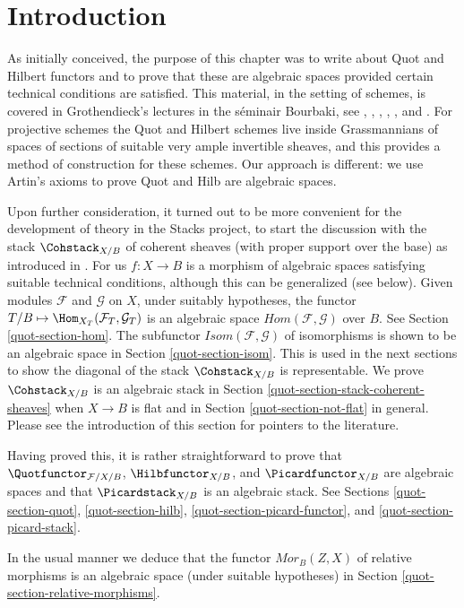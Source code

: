 \section{Introduction}
\label{quot-section-introduction}
As initially conceived, the purpose of this chapter was to write about
Quot and Hilbert functors and to prove that these are algebraic spaces
provided certain technical conditions are satisfied. This material, in
the setting of schemes, is
covered in Grothendieck's lectures in the s\'eminair Bourbaki, see
\cite{Gr-I},
\cite{Gr-II},
\cite{Gr-III},
\cite{Gr-IV},
\cite{Gr-V}, and
\cite{Gr-VI}. For projective schemes the Quot and Hilbert schemes
live inside Grassmannians of spaces of sections of suitable very
ample invertible sheaves, and this provides a method of construction
for these schemes. Our approach is different: we use Artin's axioms to
prove Quot and Hilb are algebraic spaces.

\medskip\noindent
Upon further consideration, it turned out to be more convenient for
the development of theory in the Stacks project, to start the
discussion with the stack $\Cohstack_{X/B}$
of coherent sheaves (with proper support over the base)
as introduced in \cite{lieblich_remarks}. For us $f : X \to B$
is a morphism of algebraic spaces satisfying suitable
technical conditions, although this can be generalized (see below).
Given modules $\mathcal{F}$ and $\mathcal{G}$
on $X$, under suitably hypotheses, the functor
$T/B \mapsto \Hom_{X_T}(\mathcal{F}_T, \mathcal{G}_T)$
is an algebraic space $\mathit{Hom}(\mathcal{F}, \mathcal{G})$
over $B$. See Section \ref{quot-section-hom}. The subfunctor
$\mathit{Isom}(\mathcal{F}, \mathcal{G})$ of isomorphisms is
shown to be an algebraic space in Section \ref{quot-section-isom}.
This is used in the next sections to show the diagonal of
the stack $\Cohstack_{X/B}$ is representable. We prove
$\Cohstack_{X/B}$ is an algebraic stack in
Section \ref{quot-section-stack-coherent-sheaves} when $X \to B$ is flat
and in Section \ref{quot-section-not-flat} in general.
Please see the introduction of this section for pointers
to the literature.

\medskip\noindent
Having proved this, it is rather straightforward to prove that
$\Quotfunctor_{\mathcal{F}/X/B}$, $\Hilbfunctor_{X/B}$, and
$\Picardfunctor_{X/B}$ are algebraic spaces and that
$\Picardstack_{X/B}$ is an algebraic stack. See
Sections \ref{quot-section-quot}, \ref{quot-section-hilb},
\ref{quot-section-picard-functor}, and \ref{quot-section-picard-stack}.

\medskip\noindent
In the usual manner we deduce that the functor $\mathit{Mor}_B(Z, X)$
of relative morphisms is an algebraic space (under suitable
hypotheses) in Section \ref{quot-section-relative-morphisms}.

